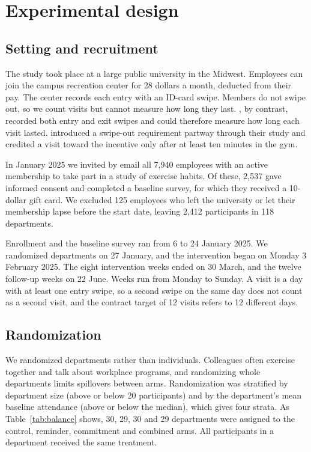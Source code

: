 \section{Experimental design}
\label{sec:design}

\subsection{Setting and recruitment}
The study took place at a large public university in the Midwest. Employees can join the campus recreation center for 28 dollars a month, deducted from their pay. The center records each entry with an ID-card swipe. Members do not swipe out, so we count visits but cannot measure how long they last. \citet{acland2015}, by contrast, recorded both entry and exit swipes and could therefore measure how long each visit lasted. \citet{carrera2018incentives} introduced a swipe-out requirement partway through their study and credited a visit toward the incentive only after at least ten minutes in the gym.

In January 2025 we invited by email all 7,940 employees with an active membership to take part in a study of exercise habits. Of these, 2,537 gave informed consent and completed a baseline survey, for which they received a 10-dollar gift card. We excluded 125 employees who left the university or let their membership lapse before the start date, leaving 2,412 participants in 118 departments.

Enrollment and the baseline survey ran from 6 to 24 January 2025. We randomized departments on 27 January, and the intervention began on Monday 3 February 2025. The eight intervention weeks ended on 30 March, and the twelve follow-up weeks on 22 June. Weeks run from Monday to Sunday. A visit is a day with at least one entry swipe, so a second swipe on the same day does not count as a second visit, and the contract target of 12 visits refers to 12 different days.

\subsection{Randomization}
We randomized departments rather than individuals. Colleagues often exercise together and talk about workplace programs, and randomizing whole departments limits spillovers between arms. Randomization was stratified by department size (above or below 20 participants) and by the department's mean baseline attendance (above or below the median), which gives four strata. As Table~\ref{tab:balance} shows, 30, 29, 30 and 29 departments were assigned to the control, reminder, commitment and combined arms. All participants in a department received the same treatment.

